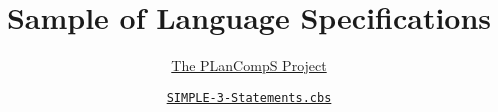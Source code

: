 \documentclass[fleqn]{article}
\title{Sample of Language Specifications}
\author{\href{https://plancomps.github.io}{The PLanCompS Project}}
\date{\href{https://github.com/plancomps/CBS-beta/blob/master/Languages-beta/SIMPLE/SIMPLE-cbs/SIMPLE/SIMPLE-3-Statements/SIMPLE-3-Statements.cbs}{\texttt{SIMPLE-3-Statements.cbs}}}
\begin{document}
\maketitle
\NOHYPER

\end{document}
